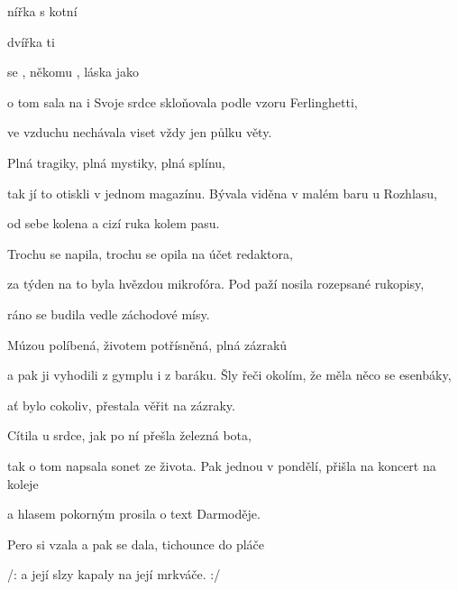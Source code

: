 
\zs
{} nířka s   kotní   

  dvířka  ti

 se , někomu ,
láska jako 

 o tom sala  na i 
    
\ks
\zs
Svoje srdce skloňovala podle vzoru Ferlinghetti,

ve vzduchu nechávala viset vždy jen půlku věty.

Plná tragiky, plná mystiky,
plná splínu,

tak jí to otiskli v jednom magazínu.
\ks
\zs
Bývala viděna v malém baru u Rozhlasu,

od sebe kolena a cizí ruka kolem pasu.

Trochu se napila, trochu se opila
na účet redaktora,

za týden na to byla hvězdou mikrofóra.
\ks
\zs
Pod paží nosila rozepsané rukopisy,

ráno se budila vedle záchodové mísy.

Múzou políbená, životem potřísněná,
plná zázraků

a pak ji vyhodili z gymplu i z baráku.
\ks
\zs
Šly řeči okolím, že měla něco se esenbáky,

ať bylo cokoliv, přestala věřit na zázraky.

Cítila u srdce, jak po ní přešla
železná bota,

tak o tom napsala sonet ze života.
\ks
\zs
Pak jednou v pondělí, přišla na koncert na koleje

a hlasem pokorným prosila o text Darmoděje.

Pero si vzala a pak se dala,
tichounce do pláče

/: a její slzy kapaly na její mrkváče. :/
\ks
\kp






